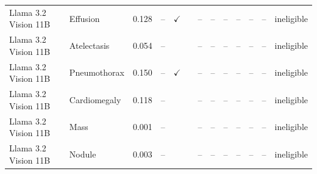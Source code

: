 \begin{longtable}{llrrccrrrrrll}
Llama 3.2 Vision 11B & Effusion & 0.128 & -- & $\checkmark$ & & -- & -- & -- & -- & -- & -- & ineligible \\
Llama 3.2 Vision 11B & Atelectasis & 0.054 & -- &  & & -- & -- & -- & -- & -- & -- & ineligible \\
Llama 3.2 Vision 11B & Pneumothorax & 0.150 & -- & $\checkmark$ & & -- & -- & -- & -- & -- & -- & ineligible \\
Llama 3.2 Vision 11B & Cardiomegaly & 0.118 & -- &  & & -- & -- & -- & -- & -- & -- & ineligible \\
Llama 3.2 Vision 11B & Mass & 0.001 & -- &  & & -- & -- & -- & -- & -- & -- & ineligible \\
Llama 3.2 Vision 11B & Nodule & 0.003 & -- &  & & -- & -- & -- & -- & -- & -- & ineligible \\
\end{longtable}
\normalsize
